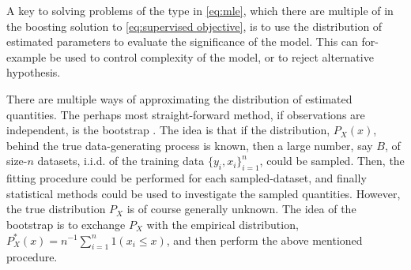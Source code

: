 
A key to solving problems of the type in \eqref{eq:mle}, which there are multiple of in the boosting solution to \eqref{eq:supervised objective}, is to use the distribution of estimated parameters to evaluate the significance of the model.
This can for-example be used to control complexity of the model, or to reject alternative hypothesis.

There are multiple ways of approximating the distribution of estimated quantities.
The perhaps most straight-forward method, if observations are independent, is the bootstrap \citep{efron1992bootstrap}.
The idea is that if the distribution, $P_X(x)$, behind the true data-generating process is known, then a large number, say $B$, of size-$n$ datasets, i.i.d. of the training data $\{y_i,x_i\}_{i=1}^n$, could be sampled.
Then, the fitting procedure could be performed for each sampled-dataset, and finally statistical methods could be used to investigate the sampled quantities.
However, the true distribution $P_X$ is of course generally unknown.
The idea of the bootstrap is to exchange $P_X$ with the empirical distribution, $P_X^*(x)=n^{-1}\sum_{i=1}^{n}1(x_i\leq x)$, and then perform the above mentioned procedure.

